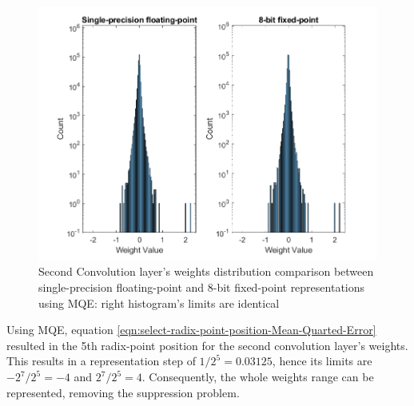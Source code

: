 \begin{figure} [H]
	\centering
	\includegraphics[scale=0.9]{Images/Weights-distributions/original-vs-fixed8/weight-distribution-conv2-MQE.png}
	\decoRule
	\caption[Second Convolution layer's weights distribution comparison between single-precision floating-point and 8-bit fixed-point representations using MQE]{Second Convolution layer's weights distribution comparison between single-precision floating-point and 8-bit fixed-point representations using MQE: right histogram's limits are identical}
	\label{fig:weight-distribution-comparison-conv2-MQE}
\end{figure}

Using MQE, equation \ref{eqn:select-radix-point-position-Mean-Quarted-Error} resulted in the 5th radix-point position for the second convolution layer's weights. This results in a representation step of $1/2^5 = 0.03125$, hence its limits are $-2^7/2^5 = -4$ and $2^7/2^5 = 4$. Consequently, the whole weights range can be represented, removing the suppression problem.

